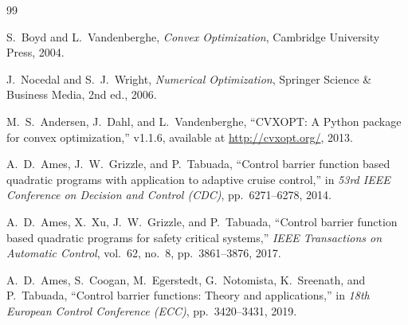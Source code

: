 \documentclass[11pt,a4paper]{article}
\begin{document}
\begin{thebibliography}{99}

S.~Boyd and L.~Vandenberghe,
\emph{Convex Optimization},
Cambridge University Press, 2004.

J.~Nocedal and S.~J.~Wright,
\emph{Numerical Optimization},
Springer Science \& Business Media, 2nd ed., 2006.

M.~S.~Andersen, J.~Dahl, and L.~Vandenberghe,
``CVXOPT: A Python package for convex optimization,''
v1.1.6, available at \url{http://cvxopt.org/}, 2013.

A.~D.~Ames, J.~W.~Grizzle, and P.~Tabuada,
``Control barrier function based quadratic programs with application to adaptive cruise control,''
in \emph{53rd IEEE Conference on Decision and Control (CDC)}, pp.~6271--6278, 2014.

A.~D.~Ames, X.~Xu, J.~W.~Grizzle, and P.~Tabuada,
``Control barrier function based quadratic programs for safety critical systems,''
\emph{IEEE Transactions on Automatic Control}, vol.~62, no.~8, pp.~3861--3876, 2017.

A.~D.~Ames, S.~Coogan, M.~Egerstedt, G.~Notomista, K.~Sreenath, and P.~Tabuada,
``Control barrier functions: Theory and applications,''
in \emph{18th European Control Conference (ECC)}, pp.~3420--3431, 2019.

\end{thebibliography}
\end{document}
